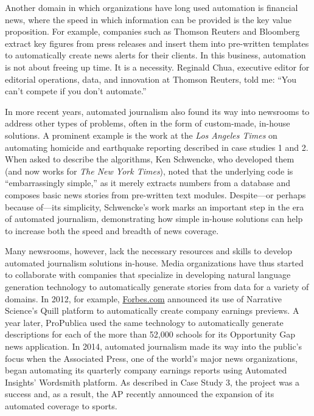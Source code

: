 \documentclass[notoc, symmetric, nobib, nols]{towcenter-guideto-book}
\begin{document}
Another domain in which organizations have long used automation is financial news, where the speed in which information can be provided is the key value proposition. For example, companies such as Thomson Reuters and Bloomberg extract key figures from press releases and insert them into pre-written templates to automatically create news alerts for their clients. In this business, automation is not about freeing up time. It is a necessity. Reginald Chua, executive editor for editorial operations, data, and innovation at Thomson Reuters, told me: ``You can't compete if you don't automate.''

In more recent years, automated journalism also found its way into newsrooms to address other types of problems, often in the form of custom-made, in-house solutions. A prominent example is the work at the \textit{Los Angeles Times} on automating homicide and earthquake reporting described in case studies 1 and 2. When asked to describe the algorithms, Ken Schwencke, who developed them (and now works for \textit{The New York Times}), noted that the underlying code is ``embarrassingly simple,'' as it merely extracts numbers from a database and composes basic news stories from pre-written text modules.\autocite{young15} Despite---or perhaps because of---its simplicity, Schwencke's work marks an important step in the era of automated journalism, demonstrating how simple in-house solutions can help to increase both the speed and breadth of news coverage. 


Many newsrooms, however, lack the necessary resources and skills to develop automated journalism solutions in-house. Media organizations have thus started to collaborate with companies that specialize in developing natural language generation technology to automatically generate stories from data for a variety of domains. In 2012, for example, \href{http://Forbes.com}{Forbes.com} announced its use of Narrative Science's Quill platform to automatically create company earnings previews.\autocite{levy12} A year later, ProPublica used the same technology to automatically generate descriptions for each of the more than 52,000 schools for its Opportunity Gap news application.\autocite{klein13} In 2014, automated journalism made its way into the public's focus when the Associated Press, one of the world's major news organizations, began automating its quarterly company earnings reports using Automated Insights' Wordsmith platform. As described in Case Study 3, the project was a success and, as a result, the AP recently announced the expansion of its automated coverage to sports.\autocite{ap15} 
\end{document}
